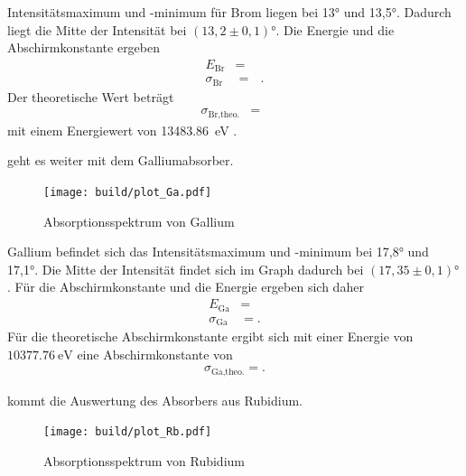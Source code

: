 \justifying Intensitätsmaximum und -minimum für Brom liegen bei 13° und 13,5°.
Dadurch liegt die Mitte der Intensität bei $(13,2\pm 0,1)°$.
Die Energie und die Abschirmkonstante ergeben
\begin{align}
    E_{\text{Br}}&= \text{ }  \label{eq:27} \\
    \sigma_{\text{Br}}&= \text{ }  \label{eq:28}.
\end{align}
Der theoretische Wert beträgt 
\begin{align}
    \sigma_{\text{Br,theo.}}&= \text{ }  \label{eq:29}
\end{align}
mit einem Energiewert von \SI{13483.86}{\electronvolt} \cite{NIST} .

\justifying geht es weiter mit dem Galliumabsorber.


\begin{figure}[H]
    \centering
    \texttt{[image: build/plot\_Ga.pdf]}
    \caption{Absorptionsspektrum von Gallium\cite{matplotlib}}
    \label{fig:5}
\end{figure}

\justifying Gallium befindet sich das Intensitätsmaximum und -minimum
bei 17,8° und 17,1°. Die Mitte der Intensität
findet sich im Graph dadurch bei $(17,35\pm 0,1)°$.
Für die Abschirmkonstante und die Energie ergeben sich daher
\begin{align}
    E_{\text{Ga}}&= \text{} \label{eq:30}\\
    \sigma _{\text{Ga}} &= \text{} \label{eq:31}.
\end{align}
Für die theoretische Abschirmkonstante ergibt sich 
mit einer Energie von $\SI{10377.76}{\electronvolt} $ \cite{NIST} eine 
Abschirmkonstante von
\begin{align}
    \sigma _{\text{Ga,theo.}} = \text{} \label{eq:32}.
\end{align}


\justifying kommt die Auswertung des Absorbers aus Rubidium.


\begin{figure}[H]
    \centering
    \texttt{[image: build/plot\_Rb.pdf]}
    \caption{Absorptionsspektrum von Rubidium\cite{matplotlib}}
    \label{fig:6}
\end{figure}

